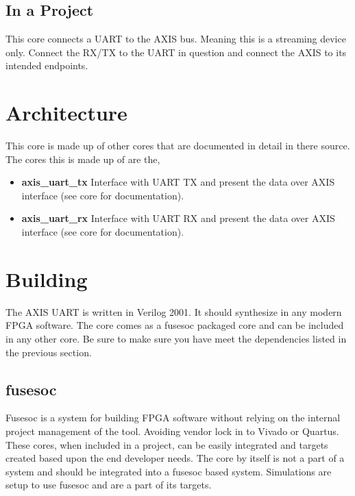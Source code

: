 

\subsection{In a Project}
\par
This core connects a UART to the AXIS bus. Meaning this is a streaming device only. Connect the RX/TX to the UART in question and connect the AXIS to its intended endpoints.

\section{Architecture}
\par
This core is made up of other cores that are documented in detail in there source. The cores this is made up of are the,
\begin{itemize}
  \item \textbf{axis\_uart\_tx} Interface with UART TX and present the data over AXIS interface (see core for documentation).
  \item \textbf{axis\_uart\_rx} Interface with UART RX and present the data over AXIS interface (see core for documentation).
\end{itemize}

\section{Building}

\par
The AXIS UART is written in Verilog 2001. It should synthesize in any modern FPGA software. The core comes as a fusesoc packaged core and can be
included in any other core. Be sure to make sure you have meet the dependencies listed in the previous section.

\subsection{fusesoc}
\par
Fusesoc is a system for building FPGA software without relying on the internal project management of the tool. Avoiding vendor lock in to Vivado or Quartus.
These cores, when included in a project, can be easily integrated and targets created based upon the end developer needs. The core by itself is not a part of
a system and should be integrated into a fusesoc based system. Simulations are setup to use fusesoc and are a part of its targets.


